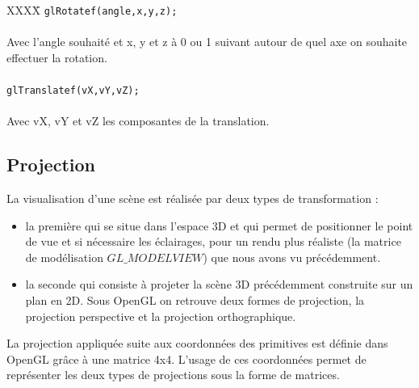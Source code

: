 \begin{tabbing}
XXXX\= \kill
\> \verb|glRotatef(angle,x,y,z);| \\\\
Avec l'angle souhaité et x, y et z à 0 ou 1 suivant autour de quel axe on souhaite\\ effectuer la rotation.\\\\
\> \verb|glTranslatef(vX,vY,vZ);|\\\\
Avec vX, vY et vZ les composantes de la translation. 
\end{tabbing}

\subsection{Projection}

La visualisation d'une scène est réalisée par deux types de transformation :

\begin{itemize}
	\item la première qui se situe dans l'espace 3D et qui permet de positionner le point de vue et si nécessaire les éclairages, pour un rendu plus réaliste (la matrice de modélisation $GL\_MODELVIEW$) que nous avons vu précédemment.

	\item la seconde qui consiste à projeter la scène 3D précédemment construite sur un plan en 2D. Sous OpenGL on retrouve deux formes de projection, la projection perspective et la projection orthographique.
\end{itemize}

La projection appliquée suite aux coordonnées des primitives est définie dans OpenGL grâce à une matrice 4x4. L'usage de ces coordonnées permet de représenter les deux types de projections sous la forme de matrices. 

